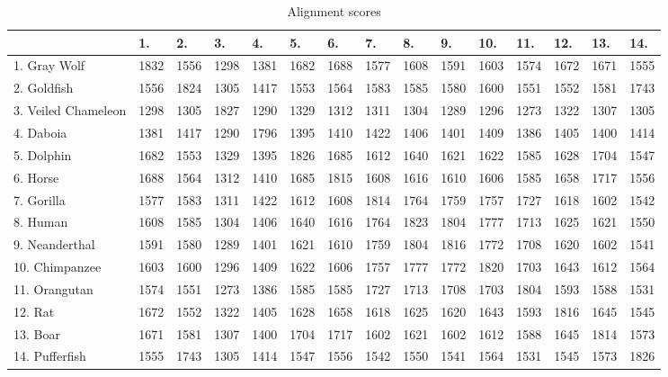\documentclass[a4paper,11pt]{article}
\begin{document}
\begin{table}[htbp,resetmargins=true]
\caption{Alignment scores}
\label{kmers}
\begin{center}
\begin{tabular}{@{}lllllllllllllll@{}}
\hline
 & 1.  & 2.  & 3.  & 4.  & 5.  & 6.  & 7.  & 8.  & 9.  & 10.  & 11.  & 12.  & 13.  & 14.\\
\hline

1. Gray Wolf & 1832 & 1556 & 1298 & 1381 & 1682 & 1688 & 1577 & 1608 & 1591 & 1603 & 1574 & 1672 & 1671 & 1555\\
2. Goldfish & 1556 & 1824 & 1305 & 1417 & 1553 & 1564 & 1583 & 1585 & 1580 & 1600 & 1551 & 1552 & 1581 & 1743\\
3. Veiled Chameleon & 1298 & 1305 & 1827 & 1290 & 1329 & 1312 & 1311 & 1304 & 1289 & 1296 & 1273 & 1322 & 1307 & 1305\\
4. Daboia & 1381 & 1417 & 1290 & 1796 & 1395 & 1410 & 1422 & 1406 & 1401 & 1409 & 1386 & 1405 & 1400 & 1414\\
5. Dolphin & 1682 & 1553 & 1329 & 1395 & 1826 & 1685 & 1612 & 1640 & 1621 & 1622 & 1585 & 1628 & 1704 & 1547\\
6. Horse & 1688 & 1564 & 1312 & 1410 & 1685 & 1815 & 1608 & 1616 & 1610 & 1606 & 1585 & 1658 & 1717 & 1556\\
7. Gorilla & 1577 & 1583 & 1311 & 1422 & 1612 & 1608 & 1814 & 1764 & 1759 & 1757 & 1727 & 1618 & 1602 & 1542\\
8. Human & 1608 & 1585 & 1304 & 1406 & 1640 & 1616 & 1764 & 1823 & 1804 & 1777 & 1713 & 1625 & 1621 & 1550\\
9. Neanderthal & 1591 & 1580 & 1289 & 1401 & 1621 & 1610 & 1759 & 1804 & 1816 & 1772 & 1708 & 1620 & 1602 & 1541\\
10. Chimpanzee & 1603 & 1600 & 1296 & 1409 & 1622 & 1606 & 1757 & 1777 & 1772 & 1820 & 1703 & 1643 & 1612 & 1564\\
11. Orangutan & 1574 & 1551 & 1273 & 1386 & 1585 & 1585 & 1727 & 1713 & 1708 & 1703 & 1804 & 1593 & 1588 & 1531\\
12. Rat & 1672 & 1552 & 1322 & 1405 & 1628 & 1658 & 1618 & 1625 & 1620 & 1643 & 1593 & 1816 & 1645 & 1545\\
13. Boar & 1671 & 1581 & 1307 & 1400 & 1704 & 1717 & 1602 & 1621 & 1602 & 1612 & 1588 & 1645 & 1814 & 1573\\
14. Pufferfish & 1555 & 1743 & 1305 & 1414 & 1547 & 1556 & 1542 & 1550 & 1541 & 1564 & 1531 & 1545 & 1573 & 1826\\

\hline
\end{tabular}
\end{center}
\end{table}
\end{document}
